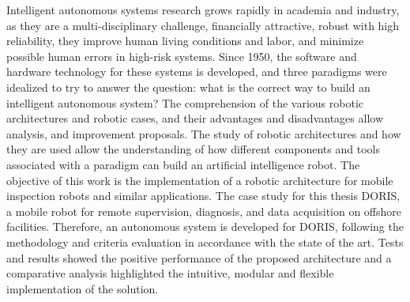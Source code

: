 \begin{foreignabstract}
\nohyphens{
Intelligent autonomous systems research grows rapidly
in academia and industry, as they are a multi-disciplinary challenge,
financially attractive, robust with high reliability, they improve
human living conditions and labor, and minimize possible human errors in
high-risk systems. Since 1950, the software and hardware technology for these
systems is developed, and three paradigms were idealized to try to answer the
question: what is the correct way to build an intelligent autonomous system? The
comprehension of the various robotic architectures and robotic cases, and their
advantages and disadvantages allow analysis, and improvement proposals. The
study of robotic architectures and how they are used allow the
understanding of how different components and tools associated with a paradigm
can build an artificial intelligence robot. The objective of this work is
the implementation of a robotic architecture for mobile inspection robots and
similar applications. The case study for this thesis DORIS, a mobile robot for
remote supervision, diagnosis, and data acquisition on offshore facilities.
Therefore, an autonomous system is developed for DORIS, following the
methodology and criteria evaluation in accordance with the state of the art.
Tests and results showed the positive performance of the proposed architecture
and a comparative analysis highlighted the intuitive, modular and
flexible implementation of the solution.
}

\end{foreignabstract}

